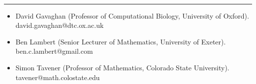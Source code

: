 \documentclass[11pt]{article}
\begin{document}
\vspace{0.5cm}



\vspace{-2.75mm} \\
\rule{\textwidth}{0.4pt}
\vspace{-.65cm}
\begin{itemize}[leftmargin=*]
\setlength{\itemsep}{4pt}
\setlength{\parskip}{0pt}
\setlength{\parsep}{0pt}
\item David Gavaghan (Professor of Computational Biology, University of Oxford).\\ \hspace*{.5cm}david.gavaghan@dtc.ox.ac.uk

\item Ben Lambert (Senior Lecturer of Mathematics, University of Exeter).\\
\hspace*{.5cm}ben.c.lambert@gmail.com

\item Simon Tavener (Professor of Mathematics, Colorado State University).\\
\hspace*{.5cm}tavener@math.colostate.edu



\end{itemize}


\vspace{0.6cm}


\end{document}
